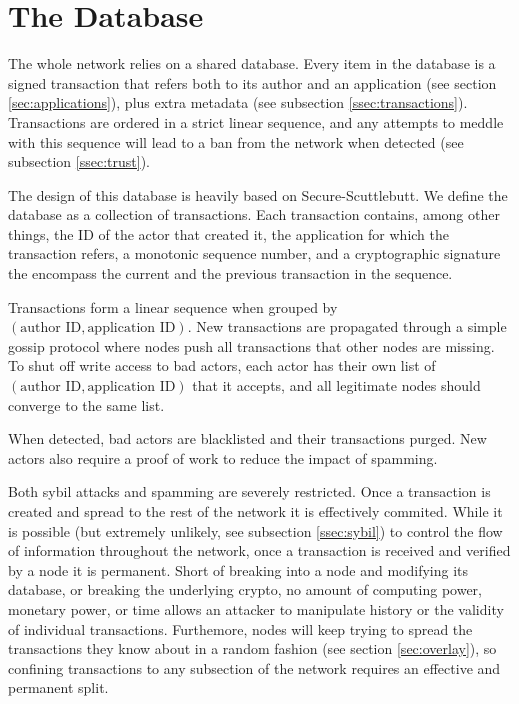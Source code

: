 \documentclass[twocolumn, a4paper]{article}
\begin{document}
\section{The Database}

The whole network relies on a shared database. Every item in the database is a signed transaction that refers both to its author and an application (see section \ref{sec:applications}), plus extra metadata (see subsection \ref{ssec:transactions}). Transactions are ordered in a strict linear sequence, and any attempts to meddle with this sequence will lead to a ban from the network when detected (see subsection \ref{ssec:trust}).

The design of this database is heavily based on Secure-Scuttlebutt\cite{kermarrec21}. We define the database as a collection of transactions. Each transaction contains, among other things, the ID of the actor that created it, the application for which the transaction refers, a monotonic sequence number, and a cryptographic signature the encompass the current and the previous transaction in the sequence.

Transactions form a linear sequence when grouped by $(\text{author ID}, \text{application ID})$. New transactions are propagated through a simple gossip protocol where nodes push all transactions that other nodes are missing. To shut off write access to bad actors, each actor has their own list of $(\text{author ID}, \text{application ID})$ that it accepts, and all legitimate nodes should converge to the same list.

When detected, bad actors are blacklisted and their transactions purged. New actors also require a proof of work to reduce the impact of spamming.

Both sybil attacks and spamming are severely restricted. Once a transaction is created and spread to the rest of the network it is effectively commited. While it is possible (but extremely unlikely, see subsection \ref{ssec:sybil}) to control the flow of information throughout the network, once a transaction is received and verified by a node it is permanent. Short of breaking into a node and modifying its database, or breaking the underlying crypto, no amount of computing power, monetary power, or time allows an attacker to manipulate history or the validity of individual transactions. Furthemore, nodes will keep trying to spread the transactions they know about in a random fashion (see section \ref{sec:overlay}), so confining transactions to any subsection of the network requires an effective and permanent split.
\end{document}
